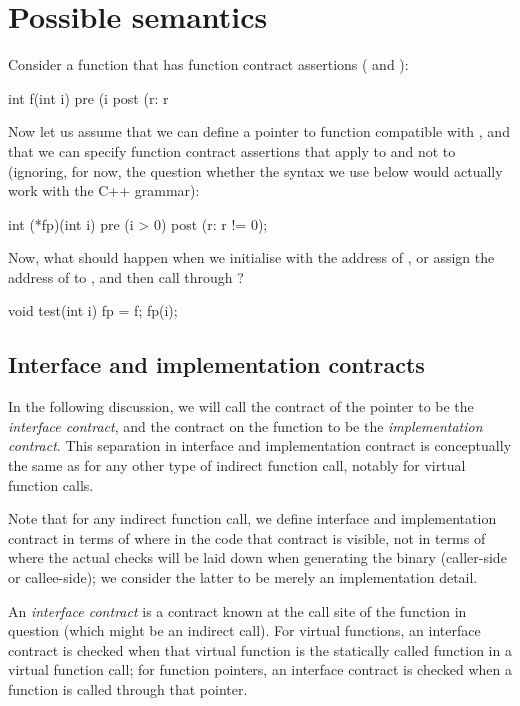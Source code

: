 \section{Possible semantics}
Consider a function that has function contract assertions ( and ):
\begin{codeblock}
int f(int i)
  pre (i %
  post (r: r %
\end{codeblock}
Now let us assume that we can define a pointer to function  compatible with , and that we can specify function contract assertions that apply to  and not to  (ignoring, for now, the question whether the syntax we use below would actually work with the C++ grammar):
\begin{codeblock}
int (*fp)(int i) 
  pre (i > 0) 
  post (r: r != 0);
\end{codeblock}
Now, what should happen when we initialise  with the address of , or assign the address of  to , and then call  through ?
\begin{codeblock}  
void test(int i) {
  fp = f;    
  fp(i);
}
\end{codeblock}
\subsection{Interface and implementation contracts}

In the following discussion, we will call the contract of the pointer  to be the \emph{interface contract}, and the contract on the function  to be the \emph{implementation contract}. This separation in interface and implementation contract is conceptually the same as for any other type of indirect function call, notably for virtual function calls.

Note that for any indirect function call, we define interface and implementation contract in terms of where in the code that contract is visible, not in terms of where the actual checks will be laid down when generating the binary (caller-side or callee-side); we consider the latter to be merely an implementation detail.

An \emph{interface contract} is a contract known at the call site of the function in question (which might be an indirect call). For virtual functions, an interface contract is checked when that virtual function is the statically called function in a virtual function call; for function pointers, an interface contract is checked when a function is called through that pointer.


